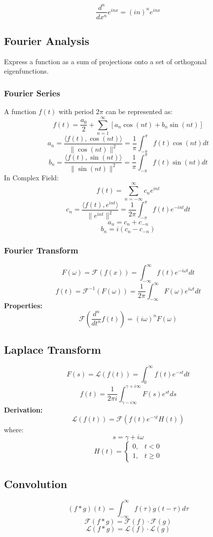 \documentclass{article}
\begin{document}
\[
    \frac{d^n}{dx^n} e^{inx} = (in)^n e^{inx}
\]

\subsection{Fourier Analysis}

Express a function as a sum of projections onto a set of orthogonal eigenfunctions.

\subsubsection{Fourier Series}

A function $f(t)$ with period $2\pi$ can be represented as:
\[
    f(t) = \frac{a_0}{2} + \sum_{n=1}^{\infty} \left[a_n \cos(nt) + b_n \sin(nt)\right]
\]
\[
    a_n = \frac{\langle f(t), \cos(nt) \rangle}{\|\cos(nt)\|^2} = \frac{1}{\pi} \int_{-\pi}^{\pi} f(t) \cos(nt) dt
\]
\[
    b_n = \frac{\langle f(t), \sin(nt) \rangle}{\|\sin(nt)\|^2} = \frac{1}{\pi} \int_{-\pi}^{\pi} f(t) \sin(nt) dt
\]
In Complex Field:
\[
    f(t) = \sum_{n=-\infty}^{\infty} c_n e^{int}
\]
\[
    c_n = \frac{\langle f(t), e^{int} \rangle}{\|e^{int}\|^2} = \frac{1}{2\pi} \int_{-\pi}^{\pi} f(t) e^{-int} dt
\]
\[
    a_n = c_n + c_{-n}
\]
\[
    b_n = i(c_n - c_{-n})
\]

\subsubsection{Fourier Transform}

\[
    F(\omega) = \mathcal{F}(f(x)) = \int_{-\infty}^{\infty} f(t) e^{-i\omega t} dt
\]
\[
    f(t) = \mathcal{F}^{-1}(F(\omega)) = \frac{1}{2\pi} \int_{-\infty}^{\infty} F(\omega) e^{i\omega t} dt
\]
\textbf{Properties:}
\[
    \mathcal{F}\left(\frac{d^n}{dt^n} f(t)\right) = (i\omega)^n F(\omega)
\]

\subsection{Laplace Transform}

\[
    F(s) = \mathcal{L}(f(t)) = \int_0^{\infty} f(t) e^{-st} dt
\]
\[
    f(t) = \frac{1}{2\pi i} \int_{\gamma - i\infty}^{\gamma + i\infty} F(s) e^{st} ds
\]
\textbf{Derivation:}
\[
    \mathcal{L}(f(t)) = \mathcal{F}(f(t) e^{-\gamma t} H(t))
\]
where:
\[
    s = \gamma + i\omega
\]
\[
    H(t) = \begin{cases}
        0, & t < 0 \\
        1, & t \geq 0
    \end{cases}
\]

\subsection{Convolution}

\[
    (f * g)(t) = \int_{-\infty}^{\infty} f(\tau) g(t - \tau) d\tau
\]
\[
    \mathcal{F}(f * g) = \mathcal{F}(f) \cdot \mathcal{F}(g)
\]
\[
    \mathcal{L}(f * g) = \mathcal{L}(f) \cdot \mathcal{L}(g)
\]
\end{document}
